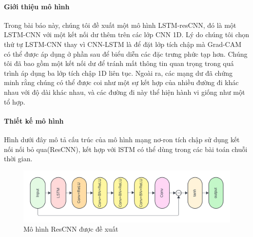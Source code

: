 \documentclass[conference]{IEEEtran}
\begin{document}
\paragraph{Giới thiệu mô hình}
Trong bài báo này, chúng tôi đề xuất một mô hình LSTM-resCNN, đó là một LSTM-CNN với một kết nối dư thêm trên các lớp CNN 1D. Lý do chúng tôi chọn thứ tự LSTM-CNN thay vì CNN-LSTM là để đặt lớp tích chập mà Grad-CAM có thể được áp dụng ở phần sau để biểu diễn các đặc trưng phức tạp hơn. Chúng tôi đã bao gồm một kết nối dư để tránh mất thông tin quan trọng trong quá trình áp dụng ba lớp tích chập 1D liên tục. Ngoài ra, các mạng dư đã chứng minh rằng chúng có thể được coi như một sự kết hợp của nhiều đường đi khác nhau với độ dài khác nhau, và các đường đi này thể hiện hành vi giống như một tổ hợp.
\paragraph{Thiết kế mô hình}
Hình dưới đây mô tả cấu trúc của mô hình mạng nơ-ron tích chập sử dụng kết nối nối bỏ qua(ResCNN), kết hợp với lSTM có thể dùng trong các bài toán chuỗi thời gian.
\begin{figure}[H]
    \centering
    \begin{minipage}{0.23\textwidth}
        \centering
        \includegraphics[width=1\textwidth]{bibliography/figure/ResCNN/ResCNN_1.png}
        \caption{Mô hình ResCNN được đề xuất}
        \label{fig:gru_del_up}
    \end{minipage}

\end{figure}
\end{document}
